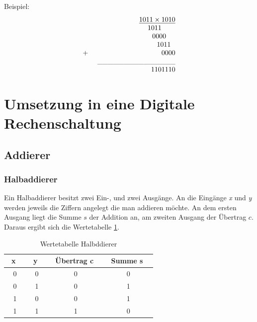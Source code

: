 \documentclass[a4paper,12pt,fleqn,oneside]{article}
\begin{document}
		Beispiel:
			\[ \begin{array}{lrcll}
   					&		 	       	\uline{1 0 1 1 \times 1 0 1 0}   	 				\\
  			       		&   			            1 0 1 1 $ $$ $$ $$ $$ $$ $        	 			\\
					&   			            0 0 0 0 $ $$ $$ $$ $        	 				\\
					&   			            1 0 1 1 $ $$ $        	 					\\
				$+ $	&   			            0 0 0 0			        	 				\\
					&	\_\_\_\_\_\_\_\_\_\_\_\_\_\_\_						\\
					&				    1101110
			\end{array} \]



\newpage

	\section{Umsetzung in eine Digitale Rechenschaltung}
	\subsection{Addierer}
		\subsubsection{Halbaddierer}
		Ein Halbaddierer besitzt zwei Ein-, und zwei Ausgänge. An die Eingänge \emph{x} und \emph{y} werden jeweils die Ziffern
		angelegt die man addieren möchte. An dem ersten Ausgang liegt die Summe $s$ der Addition an, am zweiten Ausgang der 
		Übertrag $c$.\\
		Daraus ergibt sich die Wertetabelle \ref{tab:halbaddierer}.
		\begin{table}[h]
			\center
			\begin{tabular}{c|c|c|c}
				\ \textbf{x} \ 	& \ \textbf{y} \ 	& \ \textbf{Übertrag c} \ & \ \textbf{Summe s} \ 	 	\\ \hline
				0 	& 0 		& 0          		& 0       			\\ \hline
				0 	& 1 		& 0          		& 1       			\\ \hline
				1 	& 0		& 0          		& 1      			 \\ \hline
				1	& 1 		& 1          		& 0      			 \\
			\end{tabular}
			\caption{Wertetabelle Halbddierer}
			\label{tab:halbaddierer}
		\end{table}
\end{document}
